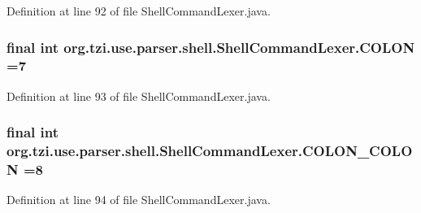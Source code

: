 Definition at line 92 of file Shell\-Command\-Lexer.\-java.

\hypertarget{classorg_1_1tzi_1_1use_1_1parser_1_1shell_1_1_shell_command_lexer_a32dd9293305a4eae81fa668eb4f943a7}{
\subsubsection[{C\-O\-L\-O\-N}]{\setlength{\rightskip}{0pt plus 5cm}final int org.\-tzi.\-use.\-parser.\-shell.\-Shell\-Command\-Lexer.\-C\-O\-L\-O\-N =7\hspace{0.3cm}{\ttfamily [static]}}}\label{classorg_1_1tzi_1_1use_1_1parser_1_1shell_1_1_shell_command_lexer_a32dd9293305a4eae81fa668eb4f943a7}


Definition at line 93 of file Shell\-Command\-Lexer.\-java.

\hypertarget{classorg_1_1tzi_1_1use_1_1parser_1_1shell_1_1_shell_command_lexer_a64410add8fee211c9e3a193d553f5621}{
\subsubsection[{C\-O\-L\-O\-N\-\_\-\-C\-O\-L\-O\-N}]{\setlength{\rightskip}{0pt plus 5cm}final int org.\-tzi.\-use.\-parser.\-shell.\-Shell\-Command\-Lexer.\-C\-O\-L\-O\-N\-\_\-\-C\-O\-L\-O\-N =8\hspace{0.3cm}{\ttfamily [static]}}}\label{classorg_1_1tzi_1_1use_1_1parser_1_1shell_1_1_shell_command_lexer_a64410add8fee211c9e3a193d553f5621}


Definition at line 94 of file Shell\-Command\-Lexer.\-java.

